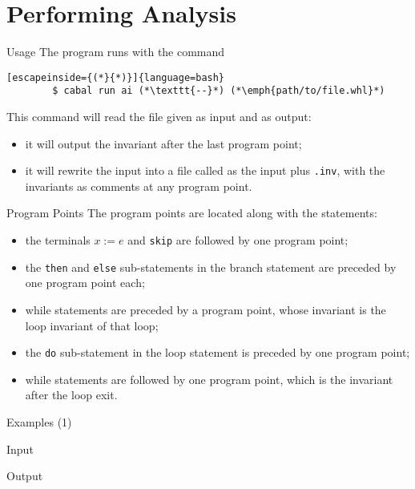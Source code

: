 \section{Performing Analysis}

\begin{frame}[fragile]{Usage}
    The program runs with the command
    \begin{lstlisting}[escapeinside={(*}{*)}]{language=bash}
        $ cabal run ai (*\texttt{--}*) (*\emph{path/to/file.whl}*)
    \end{lstlisting}
    This command will read the file given as input and as output:
    \begin{itemize}
        \item it will output the invariant after the last program point;
        \item it will rewrite the input into a file called as the input plus \texttt{.inv}, with the invariants as comments at any program point.
    \end{itemize}
    
\end{frame}

\begin{frame}{Program Points}
    The program points are located along with the statements:
    \begin{itemize}
        \item the terminals $x\mathtt{ := }e$ and \texttt{skip} are followed by one program point;
        \item the \texttt{then} and \texttt{else} sub-statements in the branch statement are preceded by one program point each;
        \item while statements are preceded by a program point, whose invariant is the loop invariant of that loop;
        \item the \texttt{do} sub-statement in the loop statement is preceded by one program point;
        \item while statements are followed by one program point, which is the invariant after the loop exit.
    \end{itemize}
\end{frame}

\begin{frame}[fragile]{Examples (1)}
    \begin{block}{Input}
        \small
    \end{block}
    \begin{block}{Output}
        \small
    \end{block}
\end{frame}

